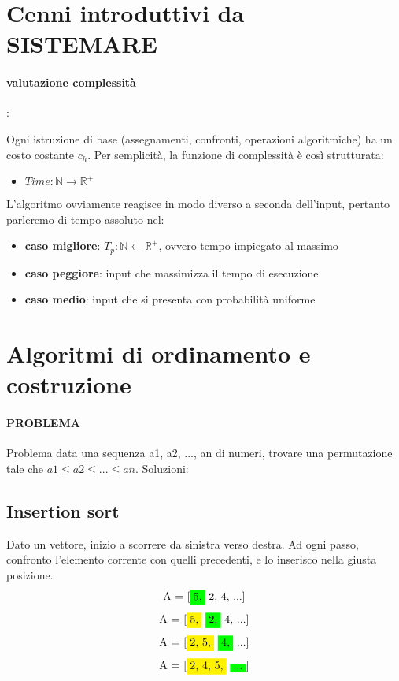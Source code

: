 \documentclass{article}
\begin{document}
\section{Cenni introduttivi da SISTEMARE}
\paragraph{valutazione complessità}: 

Ogni istruzione di base (assegnamenti, confronti, operazioni algoritmiche) ha un costo costante $c_h$.
Per semplicità, la funzione di complessità è così strutturata:
\begin{itemize}
    \item $Time: \mathbb{N} \rightarrow \mathbb{R^+}$
\end{itemize}
L'algoritmo ovviamente reagisce in modo diverso a seconda dell'input, pertanto parleremo di tempo assoluto nel:
\begin{itemize}
    \item \textbf{caso migliore}: $T_p:\mathbb{N} \leftarrow \mathbb{R^+}$, ovvero tempo impiegato al massimo
    \item \textbf{caso peggiore}: input che massimizza il tempo di esecuzione
    \item \textbf{caso medio}: input che si presenta con probabilità uniforme
\end{itemize}
\section{Algoritmi di ordinamento e costruzione}
\paragraph{PROBLEMA} Problema data una sequenza a1, a2, ..., an di numeri, trovare una permutazione tale che 
$a1 \leq a2  \leq ... \leq an$. \newline
Soluzioni:
\hypertarget{insertionsort}{} \subsection{Insertion sort}  %

Dato un vettore, inizio a scorrere da sinistra verso destra. Ad ogni passo, confronto l'elemento corrente con quelli precedenti, e lo inserisco nella 
giusta posizione.
\[\text{A = [\colorbox{green}{5,} 2, 4, ...]}\]
\[\text{A = [\colorbox{yellow}{5,} \colorbox{green}{2,} 4, ...]}\]
\[\text{A = [\colorbox{yellow}{2, 5,} \colorbox{green}{4,} ...]}\]
\[\text{A = [\colorbox{yellow}{2, 4, 5,} \colorbox{green}{...}]}\]
\end{document}
